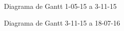 \newpage
\begin{figure}[H]
\caption{Diagrama de Gantt 1-05-15 a 3-11-15}
\end{figure}
\newpage
\begin{figure}[H]
\caption{Diagrama de Gantt 3-11-15 a 18-07-16}
\end{figure}
\newpage

